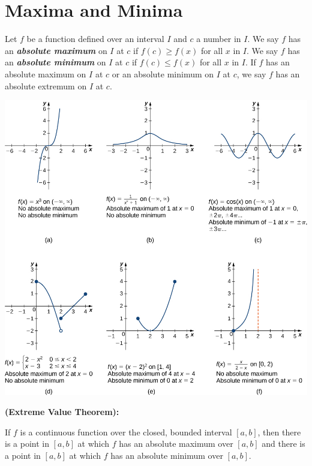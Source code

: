 
\hypertarget{maxima-and-minima}{%
\section{Maxima and Minima}\label{maxima-and-minima}}

\begin{definition}

Let \(f\) be a function defined over an interval \(I\) and \(c\) a
number in \(I\). We say \(f\) has an \textbf{\emph{absolute maximum}} on
\(I\) at \(c\) if \(f(c)\ge f(x)\) for all \(x\) in \(I\). We say \(f\) has
an \textbf{\emph{absolute minimum}} on \(I\) at \(c\) if \(f(c) \le f(x)\)
for all \(x\) in \(I\). If \(f\) has an absolute maximum on \(I\) at
\(c\) or an absolute minimum on \(I\) at \(c\), we say \(f\) has an
absolute extremum on \(I\) at \(c\).

\begin{fullwidth}
  \centering
  \includegraphics[width=0.8\linewidth]{img/CNX_Calc_Figure_04_03_010.jpeg}
\end{fullwidth}

\end{definition}

\begin{theorem}

\textbf{(Extreme Value Theorem):}

If \(f\) is a continuous function over the closed, bounded interval
\([a,b]\), then there is a point in \([a,b]\) at which \(f\) has an
absolute maximum over \([a,b]\) and there is a point in \([a,b]\) at
which \(f\) has an absolute minimum over \([a,b]\).

\end{theorem}

